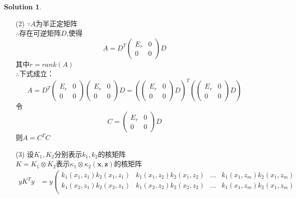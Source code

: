 \documentclass[a4paper,UTF8]{article}
\numberwithin{equation}{section}
\theoremstyle{definition}
\newtheorem*{solution}{Solution}
\def \x {\mathbf{x}}
\def \z {\mathbf{z}}
\begin{document}
\begin{solution}
\begin{enumerate}
	\item[(2)]
	$\because A$为半正定矩阵\\
	$\therefore$存在可逆矩阵$D$,使得
	\begin{equation}
		A=D^{T}
		\left(
		\begin{array}{cc}
		E_r & 0  \\
		0 & 0
		\end{array}
		\right)    
		D    
	\end{equation}
	其中$r = rank(A)$\\
	$\therefore $下式成立：\\
	\begin{equation}
		A=D^{T}
		\left(
		\begin{array}{cc}
		E_r & 0  \\
		0 & 0
		\end{array}
		\right)
		\left(
			\begin{array}{cc}
			E_r & 0  \\
			0 & 0
			\end{array}
		\right)    
		D=
		\left(
		\left(
			\begin{array}{cc}
			E_r & 0  \\
			0 & 0
			\end{array}
		\right)
		D
		\right)^{T}
		\left(
		\left(
			\begin{array}{cc}
			E_r & 0  \\
			0 & 0
			\end{array}
		\right)
		D
		\right)
	\end{equation}
	令
	\begin{equation}
		C=
		\left(
			\begin{array}{cc}
			E_r & 0  \\
			0 & 0
			\end{array}
		\right)
		D
	\end{equation}
	则$A=C^{T}C$
	\item[(3)]
	设$K_1,K_2$分别表示$k_1, k_2$的核矩阵\\
	$K=K_1 \otimes K_2$表示$\kappa_1 \otimes \kappa_2(\x, \z)$的核矩阵\\
	\begin{equation}
		\begin{aligned}
			yK^{T}y &= y
			\left(
			\begin{array}{cccc}
				k_1(x_1,z_1)k_2(x_1,z_1) & k_1(x_1,z_2)k_2(x_1,z_2) & ... & k_1(x_1,z_m)k_2(x_1,z_m) \\
				k_1(x_2,z_1)k_2(x_2,z_1) & k_1(x_2,z_2)k_2(x_2,z_2) & ... & k_1(x_1,z_m)k_2(x_1,z_m) \\

\end{array}
\end{aligned}
\end{equation}
\end{enumerate}
\end{solution}
\end{document}
